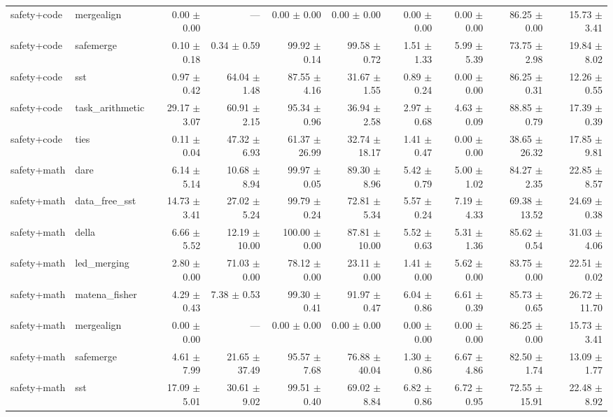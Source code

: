 \begin{table}[H]
{\begin{tabular}{llrrrrrrrr}
safety+code & mergealign & 0.00 $\pm$ 0.00 & --- & 0.00 $\pm$ 0.00 & 0.00 $\pm$ 0.00 & 0.00 $\pm$ 0.00 & 0.00 $\pm$ 0.00 & 86.25 $\pm$ 0.00 & 15.73 $\pm$ 3.41 \\
safety+code & safemerge & 0.10 $\pm$ 0.18 & 0.34 $\pm$ 0.59 & 99.92 $\pm$ 0.14 & 99.58 $\pm$ 0.72 & 1.51 $\pm$ 1.33 & 5.99 $\pm$ 5.39 & 73.75 $\pm$ 2.98 & 19.84 $\pm$ 8.02 \\
safety+code & sst & 0.97 $\pm$ 0.42 & 64.04 $\pm$ 1.48 & 87.55 $\pm$ 4.16 & 31.67 $\pm$ 1.55 & 0.89 $\pm$ 0.24 & 0.00 $\pm$ 0.00 & 86.25 $\pm$ 0.31 & 12.26 $\pm$ 0.55 \\
safety+code & task\_arithmetic & 29.17 $\pm$ 3.07 & 60.91 $\pm$ 2.15 & 95.34 $\pm$ 0.96 & 36.94 $\pm$ 2.58 & 2.97 $\pm$ 0.68 & 4.63 $\pm$ 0.09 & 88.85 $\pm$ 0.79 & 17.39 $\pm$ 0.39 \\
safety+code & ties & 0.11 $\pm$ 0.04 & 47.32 $\pm$ 6.93 & 61.37 $\pm$ 26.99 & 32.74 $\pm$ 18.17 & 1.41 $\pm$ 0.47 & 0.00 $\pm$ 0.00 & 38.65 $\pm$ 26.32 & 17.85 $\pm$ 9.81 \\
safety+math & dare & 6.14 $\pm$ 5.14 & 10.68 $\pm$ 8.94 & 99.97 $\pm$ 0.05 & 89.30 $\pm$ 8.96 & 5.42 $\pm$ 0.79 & 5.00 $\pm$ 1.02 & 84.27 $\pm$ 2.35 & 22.85 $\pm$ 8.57 \\
safety+math & data\_free\_sst & 14.73 $\pm$ 3.41 & 27.02 $\pm$ 5.24 & 99.79 $\pm$ 0.24 & 72.81 $\pm$ 5.34 & 5.57 $\pm$ 0.24 & 7.19 $\pm$ 4.33 & 69.38 $\pm$ 13.52 & 24.69 $\pm$ 0.38 \\
safety+math & della & 6.66 $\pm$ 5.52 & 12.19 $\pm$ 10.00 & 100.00 $\pm$ 0.00 & 87.81 $\pm$ 10.00 & 5.52 $\pm$ 0.63 & 5.31 $\pm$ 1.36 & 85.62 $\pm$ 0.54 & 31.03 $\pm$ 4.06 \\
safety+math & led\_merging & 2.80 $\pm$ 0.00 & 71.03 $\pm$ 0.00 & 78.12 $\pm$ 0.00 & 23.11 $\pm$ 0.00 & 1.41 $\pm$ 0.00 & 5.62 $\pm$ 0.00 & 83.75 $\pm$ 0.00 & 22.51 $\pm$ 0.02 \\
safety+math & matena\_fisher & 4.29 $\pm$ 0.43 & 7.38 $\pm$ 0.53 & 99.30 $\pm$ 0.41 & 91.97 $\pm$ 0.47 & 6.04 $\pm$ 0.86 & 6.61 $\pm$ 0.39 & 85.73 $\pm$ 0.65 & 26.72 $\pm$ 11.70 \\
safety+math & mergealign & 0.00 $\pm$ 0.00 & --- & 0.00 $\pm$ 0.00 & 0.00 $\pm$ 0.00 & 0.00 $\pm$ 0.00 & 0.00 $\pm$ 0.00 & 86.25 $\pm$ 0.00 & 15.73 $\pm$ 3.41 \\
safety+math & safemerge & 4.61 $\pm$ 7.99 & 21.65 $\pm$ 37.49 & 95.57 $\pm$ 7.68 & 76.88 $\pm$ 40.04 & 1.30 $\pm$ 0.86 & 6.67 $\pm$ 4.86 & 82.50 $\pm$ 1.74 & 13.09 $\pm$ 1.77 \\
safety+math & sst & 17.09 $\pm$ 5.01 & 30.61 $\pm$ 9.02 & 99.51 $\pm$ 0.40 & 69.02 $\pm$ 8.84 & 6.82 $\pm$ 0.86 & 6.72 $\pm$ 0.95 & 72.55 $\pm$ 15.91 & 22.48 $\pm$ 8.92 \\

\end{tabular}}
\end{table}
